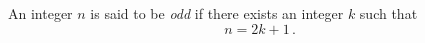 \guard

\begin{defn}
\label{defn:odd}
  An integer $n$ is said to be \emph{odd} if there exists an integer $k$ such that \[ n = 2 k + 1\,.\]
\end{defn}
